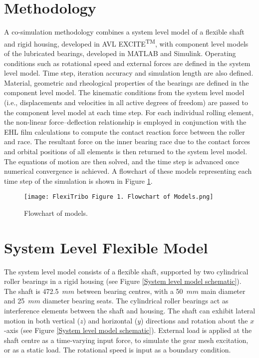 \section{Methodology}

A co-simulation methodology combines a system level model of a flexible shaft and rigid housing, developed in AVL EXCITE\textsuperscript{TM}, with component level models of the lubricated bearings, developed in MATLAB and Simulink. Operating conditions such as rotational speed and external forces are defined in the system level model. Time step, iteration accuracy and simulation length are also defined. Material, geometric and rheological properties of the bearings are defined in the component level model. The kinematic conditions from the system level model (i.e., displacements and velocities in all active degrees of freedom) are passed to the component level model at each time step. For each individual rolling element, the non-linear force–deflection relationship is employed in conjunction with the EHL film calculations to compute the contact reaction force between the roller and race. The resultant force on the inner bearing race due to the contact forces and orbital positions of all elements is then returned to the system level model. The equations of motion are then solved, and the time step is advanced once numerical convergence is achieved. A flowchart of these models representing each time step of the simulation is shown in Figure \ref{Flowchart of models}.

\begin{figure}
	\texttt{[image: FlexiTribo Figure 1. Flowchart of Models.png]}
	\caption{Flowchart of models.}
	\label{Flowchart of models}
\end{figure} 

\section{System Level Flexible Model}

The system level model consists of a flexible shaft, supported by two cylindrical roller bearings in a rigid housing (see Figure \ref{System level model schematic}). The shaft is 472.5~$mm$ between bearing centres, with a 50~$mm$ main diameter and 25~$mm$ diameter bearing seats. The cylindrical roller bearings act as interference elements between the shaft and housing. The shaft can exhibit lateral motion in both vertical ($z$) and horizontal ($y$) directions and rotation about the $x$-axis (see Figure \ref{System level model schematic}). External load is applied at the shaft centre as a time-varying input force, to simulate the gear mesh excitation, or as a static load. The rotational speed is input as a boundary condition.

